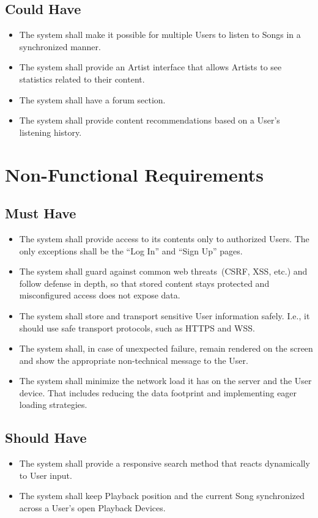 \subsection*{Could Have}
\begin{itemize}
    \item The system shall make it possible for multiple Users to listen to Songs in a synchronized manner.
    \item The system shall provide an Artist interface that allows Artists to see statistics related to their content.
    \item The system shall have a forum section.
    \item The system shall provide content recommendations based on a User's listening history.
\end{itemize}


\section{Non-Functional Requirements}

\subsection*{Must Have}
\begin{itemize}
    \item
    The system shall provide access to its contents only to authorized Users.
    The only exceptions shall be the ``Log In'' and ``Sign Up'' pages.
    \item
    The system shall guard against common web threats~(CSRF, XSS, etc.) and follow defense in depth, so that stored content stays protected and misconfigured access does not expose data.
    \item
    The system shall store and transport sensitive User information safely.
    I.e., it should use safe transport protocols, such as HTTPS and WSS.
    \item
    The system shall, in case of unexpected failure, remain rendered on the screen and show the appropriate non-technical message to the User.
    \item
    The system shall minimize the network load it has on the server and the User device.
    That includes reducing the data footprint and implementing eager loading strategies.
\end{itemize}

\subsection*{Should Have}
\begin{itemize}
    \item The system shall provide a responsive search method that reacts dynamically to User input.
    \item The system shall keep Playback position and the current Song synchronized across a User's open Playback Devices.
\end{itemize}

